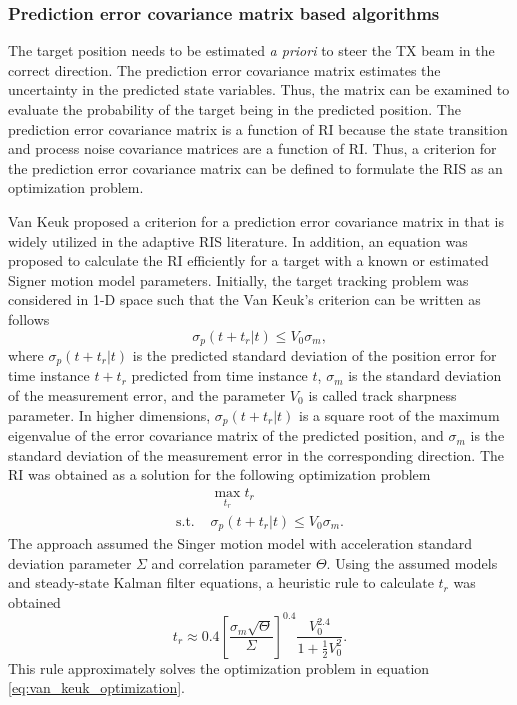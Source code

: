 \documentclass[english, 12pt, a4paper, elec, utf8, a-1b, online]{aaltothesis}
\numberwithin{equation}{section}
\def\prior{\textit{a priori}}
\newcommand{\ri}{t_r}
\begin{document}
\subsubsection{Prediction error covariance matrix based algorithms}

\newcommand{\ndwells}{{n_d}}


The target position needs to be estimated \prior{} to steer the TX beam in the correct direction. 
The prediction error covariance matrix estimates the uncertainty in the predicted state variables.
Thus, the matrix can be examined to evaluate the probability of the target being in the predicted position.
The prediction error covariance matrix is a function of RI because the state transition and process noise covariance matrices are a function of RI.
Thus, a criterion for the prediction error covariance matrix can be defined to formulate the RIS as an optimization problem.

Van Keuk proposed a criterion for a prediction error covariance matrix in \cite{Keuk1975} that is widely utilized in the adaptive RIS literature.
In addition, an equation was proposed to calculate the RI efficiently for a target with a known or estimated Signer motion model \cite{RongLi2003} parameters.
Initially, the target tracking problem was considered in 1-D space such that the Van Keuk's criterion can be written as follows
\begin{equation}\label{eq:criterion}
    \sigma_p(t + \ri | t) \leq V_0 \sigma_m,
\end{equation}
where $\sigma_p(t + \ri | t)$ is the predicted standard deviation of the position error for time instance $t+\ri$ predicted from time instance $t$, $\sigma_m$ is the standard deviation of the measurement error, and the parameter $V_0$ is called track sharpness parameter.
In higher dimensions, $\sigma_p(t + \ri | t)$ is a square root of the maximum eigenvalue of the error covariance matrix of the predicted position, and $\sigma_m$ is the standard deviation of the measurement error in the corresponding direction.
The RI was obtained as a solution for the following optimization problem
\begin{equation}\label{eq:van_keuk_optimization}
\begin{array}{ll}
     & \max_{\ri} \ri \\[7pt]
    \text{s.t. } &\sigma_p(t + \ri | t) \leq V_0 \sigma_m. 
\end{array}
\end{equation}
The approach assumed the Singer motion model with acceleration standard deviation parameter $\Sigma$ and correlation parameter $\Theta$.
Using the assumed models and steady-state Kalman filter equations, a heuristic rule to calculate $\ri$ was obtained
\begin{equation}\label{eq:keuk_time}
    \ri \approx 0.4 \left[ \frac{\sigma_m \sqrt{\Theta}}{\Sigma} \right]^{0.4} \frac{V_0^{2.4}}{1+\frac{1}{2}V_0^2}.
\end{equation}
This rule approximately solves the optimization problem in equation \eqref{eq:van_keuk_optimization}.
\end{document}
